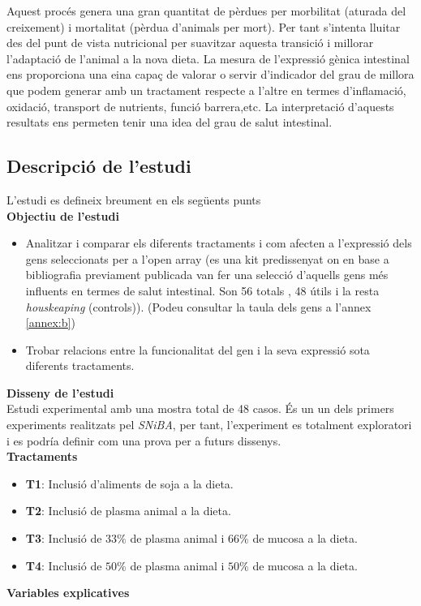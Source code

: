 \documentclass[english]{article}
\begin{document}
Aquest procés genera una gran quantitat de pèrdues per morbilitat (aturada del creixement) i mortalitat (pèrdua d'animals per mort). Per tant s'intenta lluitar des del punt de vista nutricional per suavitzar aquesta transició i millorar l'adaptació de l'animal a la nova dieta. La mesura de l'expressió gènica intestinal ens proporciona una eina capaç de valorar o servir d'indicador del grau de millora que podem generar amb un tractament respecte a l'altre en termes d'inflamació, oxidació, transport de nutrients, funció barrera,etc. La interpretació d'aquests resultats ens permeten tenir una idea del grau de salut intestinal.
\subsection{Descripció de l'estudi}
L'estudi es defineix breument en els següents punts\\

\noindent\textbf{Objectiu de l'estudi}
\begin{itemize}
  \item Analitzar i comparar els diferents tractaments i com afecten a l'expressió dels gens seleccionats per a l'open array (es una kit predissenyat on en base a bibliografia previament publicada van fer una selecció d'aquells gens més influents en termes de salut intestinal. Son 56 totals , 48 útils i la resta \textit{houskeaping} (controls)). (Podeu consultar la taula dels gens a l'annex \ref{annex:b})
  \item Trobar relacions entre la funcionalitat del gen i la seva expressió sota diferents tractaments.
\end{itemize}
\newpage
\noindent\textbf{Disseny de l'estudi}\\

Estudi experimental amb una mostra total de 48 casos. És un un dels primers experiments realitzats pel \textit{SNiBA}, per tant, l'experiment es totalment exploratori i es podría definir com una prova per a futurs dissenys.\\
\noindent\textbf{Tractaments}
\begin{itemize}
  \item \textbf{T1}: Inclusió d'aliments de soja a la dieta.
  \item \textbf{T2}: Inclusió de plasma animal a la dieta.
  \item \textbf{T3}: Inclusió de $33\%$ de plasma animal i  $66\%$ de mucosa a la dieta.
  \item \textbf{T4}: Inclusió de $50\%$ de plasma animal i  $50\%$ de mucosa a la dieta.
\end{itemize}
\noindent\textbf{Variables explicatives}\\
\end{document}
